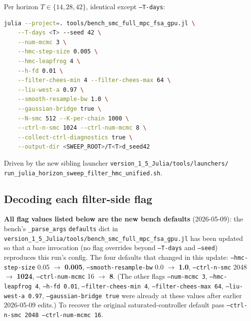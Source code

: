 \documentclass[11pt,a4paper]{article}
\begin{document}
Per horizon $T \in \{14, 28, 42\}$, identical except \texttt{--T-days}:

\begin{lstlisting}[language=bash]
julia --project=. tools/bench_smc_full_mpc_fsa_gpu.jl \
    --T-days <T> --seed 42 \
    --num-mcmc 3 \
    --hmc-step-size 0.005 \
    --hmc-leapfrog 4 \
    --h-fd 0.01 \
    --filter-chees-min 4 --filter-chees-max 64 \
    --liu-west-a 0.97 \
    --smooth-resample-bw 1.0 \
    --gaussian-bridge true \
    --N-smc 512 --K-per-chain 1000 \
    --ctrl-n-smc 1024 --ctrl-num-mcmc 8 \
    --collect-ctrl-diagnostics true \
    --output-dir <SWEEP_ROOT>/T<T>d_seed42
\end{lstlisting}

Driven by the new sibling launcher
\texttt{version\_1\_5\_Julia/tools/launchers/}\\
\texttt{run\_julia\_horizon\_sweep\_filter\_hmc\_unified.sh}.

\subsection{Decoding each filter-side flag}

\textbf{All flag values listed below are the new bench defaults}
(2026-05-09): the bench's \texttt{\_parse\_args} \texttt{defaults}
dict in
\texttt{version\_1\_5\_Julia/tools/bench\_smc\_full\_mpc\_fsa\_gpu.jl}
has been updated so that a bare invocation (no flag overrides
beyond \texttt{--T-days} and \texttt{--seed}) reproduces this run's
config. The four defaults that changed in this update:
\texttt{--hmc-step-size} 0.05 $\to$ \textbf{0.005},
\texttt{--smooth-resample-bw} 0.0 $\to$ \textbf{1.0},
\texttt{--ctrl-n-smc} 2048 $\to$ \textbf{1024},
\texttt{--ctrl-num-mcmc} 16 $\to$ \textbf{8}. (The other flags
\texttt{--num-mcmc 3}, \texttt{--hmc-leapfrog 4}, \texttt{--h-fd 0.01},
\texttt{--filter-chees-min 4}, \texttt{--filter-chees-max 64},
\texttt{--liu-west-a 0.97}, \texttt{--gaussian-bridge true} were
already at these values after earlier 2026-05-09 edits.) To recover
the original saturated-controller default pass
\texttt{--ctrl-n-smc 2048 --ctrl-num-mcmc 16}.
\end{document}
